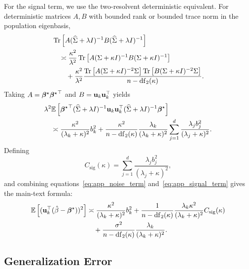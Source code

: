 For the signal term, we use the two-resolvent deterministic equivalent. For deterministic matrices $A,B$ with bounded rank or bounded trace norm in the population eigenbasis,
\begin{align}
    &\operatorname{Tr}\left[
    A(\widehat{\Sigma}+\lambda I)^{-1}
    B(\widehat{\Sigma}+\lambda I)^{-1}
    \right]
    \nonumber\\
    &\quad\asymp
    \frac{\kappa^2}{\lambda^2}
    \operatorname{Tr}\left[
    A(\Sigma+\kappa I)^{-1}
    B(\Sigma+\kappa I)^{-1}
    \right]
    \nonumber\\
    &\qquad+
    \frac{\kappa^2}{\lambda^2}
    \frac{
    \operatorname{Tr}\left[
    A(\Sigma+\kappa I)^{-2}\Sigma
    \right]
    \operatorname{Tr}\left[
    B(\Sigma+\kappa I)^{-2}\Sigma
    \right]}
    {n-\mathrm{df}_{2}(\kappa)} .
    \label{eq:app_two_resolvent}
\end{align}
Taking $A=\boldsymbol{\beta}^{\star}{\boldsymbol{\beta}^{\star}}^{\top}$ and $B=\mathbf{u}_k\mathbf{u}_k^\top$ yields
\begin{align}
    &\lambda^2
    \mathbb{E}\left[
    {\boldsymbol{\beta}^{\star}}^{\top}(\widehat{\Sigma}+\lambda I)^{-1}
    \mathbf{u}_k\mathbf{u}_k^\top
    (\widehat{\Sigma}+\lambda I)^{-1}\boldsymbol{\beta}^{\star}
    \right]
    \nonumber\\
    &\quad\asymp
    \frac{\kappa^2}{(\lambda_k+\kappa)^2}b_k^2
    +
    \frac{\kappa^2}{n-\mathrm{df}_{2}(\kappa)}
    \frac{\lambda_k}{(\lambda_k+\kappa)^2}
    \sum_{j=1}^{d}
    \frac{\lambda_j b_j^2}{(\lambda_j+\kappa)^2}.
    \label{eq:app_signal_term}
\end{align}
Defining
\begin{equation}
    C_{\mathrm{sig}}(\kappa)=
    \sum_{j=1}^{d}
    \frac{\lambda_j b_j^2}{(\lambda_j+\kappa)^2},
\end{equation}
and combining equations~\eqref{eq:app_noise_term} and~\eqref{eq:app_signal_term} gives the main-text formula:
\begin{align}
    \mathbb{E}\left[(\mathbf{u}_k^\top(\hat{\beta}-\boldsymbol{\beta}^{\star}))^2\right]
    &\asymp
    \frac{\kappa^2}{(\lambda_k+\kappa)^2}b_k^2
    +
    \frac{1}{n-\mathrm{df}_{2}(\kappa)}
    \frac{\lambda_k\kappa^2}{(\lambda_k+\kappa)^2}
    C_{\mathrm{sig}}(\kappa)
    \nonumber\\
    &\quad+
    \frac{\sigma^2}{n-\mathrm{df}_{2}(\kappa)}
    \frac{\lambda_k}{(\lambda_k+\kappa)^2}.
    \label{eq:app_perpc_final}
\end{align}

\subsection{Generalization Error}


